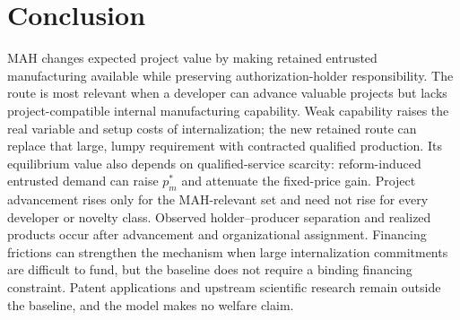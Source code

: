 \documentclass[12pt]{article}
\newcommand{\1}{\mathbf{1}}
\begin{document}
\section{Conclusion}

MAH changes expected project value by making retained entrusted manufacturing
available while preserving authorization-holder responsibility. The route is
most relevant when a developer can advance valuable projects but lacks
project-compatible internal manufacturing capability. Weak capability raises
the real variable and setup costs of internalization; the new retained route
can replace that large, lumpy requirement with contracted qualified
production. Its equilibrium value also depends on qualified-service scarcity:
reform-induced entrusted demand can raise \(p_m^*\) and attenuate the
fixed-price gain. Project advancement rises only for the MAH-relevant set and
need not rise for every developer or novelty class. Observed holder--producer
separation and realized products occur after advancement and organizational
assignment. Financing frictions can strengthen the mechanism when large
internalization commitments are difficult to fund, but the baseline does not
require a binding financing constraint. Patent applications and upstream
scientific research remain outside the baseline, and the model makes no
welfare claim.

\clearpage


\end{document}

